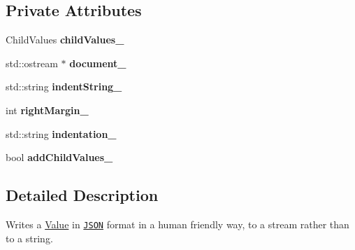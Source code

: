 \subsection*{Private Attributes}
\begin{DoxyCompactItemize}
\item 
\hypertarget{class_json_1_1_styled_stream_writer_aafd62e00a401df73fcacb2e410114b3d}{Child\-Values {\bfseries child\-Values\-\_\-}}\label{class_json_1_1_styled_stream_writer_aafd62e00a401df73fcacb2e410114b3d}

\item 
\hypertarget{class_json_1_1_styled_stream_writer_aa6a4be02f654d9105af8fa560b676967}{std\-::ostream $\ast$ {\bfseries document\-\_\-}}\label{class_json_1_1_styled_stream_writer_aa6a4be02f654d9105af8fa560b676967}

\item 
\hypertarget{class_json_1_1_styled_stream_writer_af9ebd4487e7f69bd1074e6ce29c7cf02}{std\-::string {\bfseries indent\-String\-\_\-}}\label{class_json_1_1_styled_stream_writer_af9ebd4487e7f69bd1074e6ce29c7cf02}

\item 
\hypertarget{class_json_1_1_styled_stream_writer_a67fdaa6758885f082b6a7ede52b0ab91}{int {\bfseries right\-Margin\-\_\-}}\label{class_json_1_1_styled_stream_writer_a67fdaa6758885f082b6a7ede52b0ab91}

\item 
\hypertarget{class_json_1_1_styled_stream_writer_a58dc0eaf85c58b83d19d6bba8eead27d}{std\-::string {\bfseries indentation\-\_\-}}\label{class_json_1_1_styled_stream_writer_a58dc0eaf85c58b83d19d6bba8eead27d}

\item 
\hypertarget{class_json_1_1_styled_stream_writer_a4e4bb7fc223b2652b72b523b1ce414fa}{bool {\bfseries add\-Child\-Values\-\_\-}}\label{class_json_1_1_styled_stream_writer_a4e4bb7fc223b2652b72b523b1ce414fa}

\end{DoxyCompactItemize}


\subsection{Detailed Description}
Writes a \hyperlink{class_json_1_1_value}{Value} in \href{http://www.json.org}{\tt J\-S\-O\-N} format in a human friendly way, to a stream rather than to a string. 

